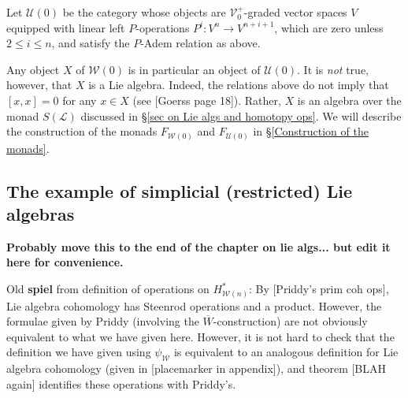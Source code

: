 \documentclass[11pt]{amsart}
\theoremstyle{plain}
\theoremstyle{definition}
\renewcommand{\to}{\longrightarrow}
\newcommand{\scrL}{\mathscr{L}}
\newcommand{\calW}{\mathcal{W}}
\newcommand{\calU}{\mathcal{U}}
\newcommand{\calV}{\mathcal{V}}
\theoremstyle{plain}
\newcommand{\LieOperad}{{\scrL}}
\newcommand{\vect}[2]{\calV^{#1}_{#2}}
\begin{document}
\begin{Conventions and notation}
Let $\calU(0)$ be the category whose objects are $\vect{+}{0}$-graded vector spaces $V$ equipped with linear left $P$-operations $P^i:V^n\to V^{n+i+1}$, which are zero unless  $2\leq i\leq n$, and satisfy the $P$-Adem relation as above.

Any object $X$ of $\calW(0)$ is in particular an object of $\calU(0)$. It is \emph{not} true, however, that $X$ is a Lie algebra. Indeed, the relations above do not imply that $[x,x]=0$ for any $x\in X$ (see [Goerss page 18]). Rather, $X$ is an algebra over the monad $S(\LieOperad)$ discussed in \S\ref{sec on Lie algs and homotopy ops}. We will describe the construction of the monads $F_{\calW(0)}$ and $F_{\calU(0)}$ in \S\ref{Construction of the monads}.

\subsection{The example of simplicial (restricted) Lie algebras}

\textbf{Probably move this to the end of the chapter on lie algs... but edit it here for convenience.}

Old \textbf{spiel} from definition of operations on $H^*_{\calW(n)}$:
By [Priddy's prim coh ops], Lie algebra cohomology has Steenrod operations and a product. However, the formulae given by Priddy (involving the $\overline{W}$-construction) are not obviously equivalent to what we have given here. However, it is not hard to check that the definition we have given using $\psi_\calW$ is equivalent to an analogous definition for Lie algebra cohomology (given in [placemarker in appendix]), and theorem [BLAH again] identifies these operations with Priddy's.

\end{Conventions and notation}
\end{document}
